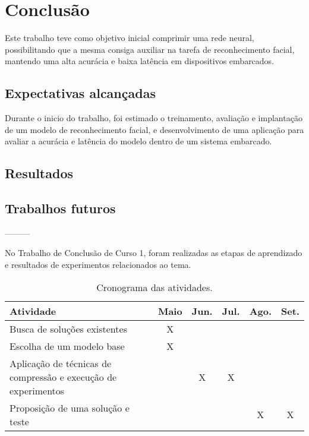 \chapter{Conclusão}
Este trabalho teve como objetivo inicial comprimir uma rede neural, possibilitando que a mesma consiga auxiliar na
tarefa de reconhecimento facial, mantendo uma alta acurácia e baixa latência em dispositivos embarcados.

\section{Expectativas alcançadas}
Durante o inicio do trabalho, foi estimado o treinamento, avaliação e implantação de um modelo de reconhecimento facial,
e desenvolvimento de uma aplicação para avaliar a acurácia e latência do modelo dentro de um sistema embarcado.

\section{Resultados}

\section{Trabalhos futuros}


---------

No Trabalho de Conclusão de Curso 1, foram realizadas as etapas de aprendizado e resultados de experimentos
relacionados ao tema.

\begin{center}
\begin{table}[htb]
\centering
\ABNTEXfontereduzida
\caption[Cronograma das atividades]{Cronograma das atividades.}
\label{tabela_plano}
\begin{tabular}{ |l|c|c|c|c|c| }
	\hline
	Atividade & Maio & Jun. & Jul. & Ago. & Set. \\
	\hline
	Busca de soluções existentes & X & & & & \\
	\hline
	Escolha de um modelo base & X & &  & & \\
	\hline
	Aplicação de técnicas de compressão e execução de experimentos & & X & X & & \\
	\hline
	Proposição de uma solução e teste & & & & X & X \\
	\hline
\end{tabular}
\end{table}
\end{center}

